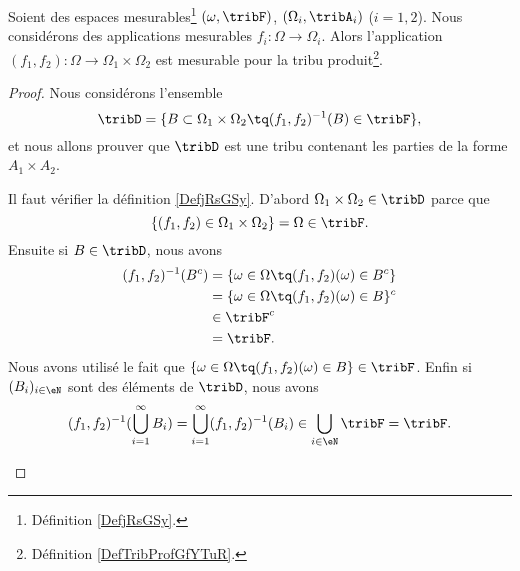 \begin{proposition}	\label{PROPooSKIEooCpLVQT}
	Soient des espaces mesurables\footnote{Définition \ref{DefjRsGSy}.} \( (\omega,\tribF)\), \( (\Omega_i,\tribA_i)\) (\( i=1,2\)). Nous considérons des applications mesurables \(f_i \colon \Omega\to \Omega_i  \). Alors l'application \((f_1,f_2) \colon \Omega\to \Omega_1\times \Omega_2  \) est mesurable pour la tribu produit\footnote{Définition \ref{DefTribProfGfYTuR}.}.
\end{proposition}

\begin{proof}
	Nous considérons l'ensemble
	\begin{equation}
		\tribD=\{ B\subset \Omega_1\times \Omega_2\tq (f_1,f_2)^{-1}(B)\in \tribF \},
	\end{equation}
	et nous allons prouver que \( \tribD\) est une tribu contenant les parties de la forme \( A_1\times A_2\).

	\begin{subproof}
		Il faut vérifier la définition \ref{DefjRsGSy}. D'abord \( \Omega_1\times \Omega_2\in \tribD\) parce que
		\begin{equation}
			\{ (f_1,f_2)\in \Omega_1\times \Omega_2 \}=\Omega\in\tribF.
		\end{equation}
		Ensuite si \( B\in \tribD\), nous avons
		\begin{subequations}
			\begin{align}
				(f_1,f_2)^{-1}(B^c) & =\{ \omega\in \Omega\tq (f_1,f_2)(\omega)\in B^c \} \\
				                    & =\{ \omega\in \Omega\tq (f_1,f_2)(\omega)\in B \}^c \\
				                    & \in\tribF^c                                         \\
				                    & =\tribF.
			\end{align}
		\end{subequations}
		Nous avons utilisé le fait que \( \{ \omega\in \Omega\tq (f_1,f_2)(\omega)\in B \}\in \tribF\). Enfin si \( (B_i)_{i\in \eN}\) sont des éléments de \( \tribD\), nous avons
		\begin{equation}
			(f_1,f_2)^{-1}(\bigcup_{i=1}^{\infty}B_i)=\bigcup_{i=1}^{\infty}(f_1,f_2)^{-1}(B_i)\in\bigcup_{i\in \eN}\tribF=\tribF.
		\end{equation}


\end{subproof}
\end{proof}

